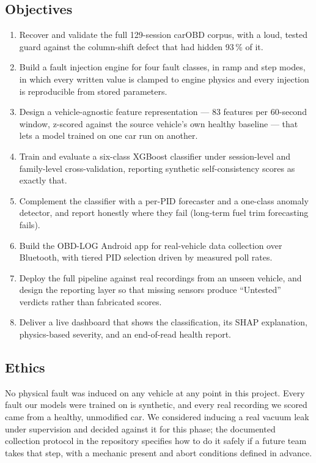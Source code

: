 \subsection{Objectives}

\begin{enumerate}
  \item Recover and validate the full 129-session carOBD corpus, with a
    loud, tested guard against the column-shift defect that had hidden
    93\,\% of it.
  \item Build a fault injection engine for four fault classes, in ramp and
    step modes, in which every written value is clamped to engine physics
    and every injection is reproducible from stored parameters.
  \item Design a vehicle-agnostic feature representation --- 83 features
    per 60-second window, z-scored against the source vehicle's own healthy
    baseline --- that lets a model trained on one car run on another.
  \item Train and evaluate a six-class XGBoost classifier under
    session-level and family-level cross-validation, reporting synthetic
    self-consistency scores as exactly that.
  \item Complement the classifier with a per-PID forecaster and a one-class
    anomaly detector, and report honestly where they fail (long-term fuel
    trim forecasting fails).
  \item Build the OBD-LOG Android app for real-vehicle data collection over
    Bluetooth, with tiered PID selection driven by measured poll rates.
  \item Deploy the full pipeline against real recordings from an unseen
    vehicle, and design the reporting layer so that missing sensors produce
    ``Untested'' verdicts rather than fabricated scores.
  \item Deliver a live dashboard that shows the classification, its SHAP
    explanation, physics-based severity, and an end-of-read health report.
\end{enumerate}

\subsection{Ethics}

No physical fault was induced on any vehicle at any point in this project.
Every fault our models were trained on is synthetic, and every real
recording we scored came from a healthy, unmodified car. We considered
inducing a real vacuum leak under supervision and decided against it for
this phase; the documented collection protocol in the repository specifies
how to do it safely if a future team takes that step, with a mechanic
present and abort conditions defined in advance.

